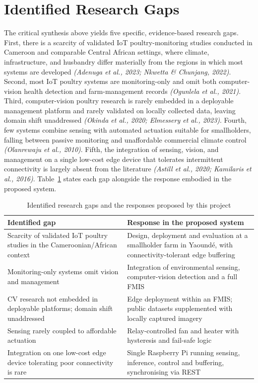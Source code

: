 \documentclass[12pt,a4paper]{report}
\begin{document}
\section{Identified Research Gaps}

The critical synthesis above yields five specific, evidence-based research gaps. First, there is a scarcity of validated IoT poultry-monitoring studies conducted in Cameroon and comparable Central African settings, where climate, infrastructure, and husbandry differ materially from the regions in which most systems are developed \textit{(Adenuga et al., 2023; Nkwetta \& Chunjang, 2022)}. Second, most IoT poultry systems are monitoring-only and omit both computer-vision health detection and farm-management records \textit{(Ogunlela et al., 2021)}. Third, computer-vision poultry research is rarely embedded in a deployable management platform and rarely validated on locally collected data, leaving domain shift unaddressed \textit{(Okinda et al., 2020; Elmessery et al., 2023)}. Fourth, few systems combine sensing with automated actuation suitable for smallholders, falling between passive monitoring and unaffordable commercial climate control \textit{(Olanrewaju et al., 2010)}. Fifth, the integration of sensing, vision, and management on a single low-cost edge device that tolerates intermittent connectivity is largely absent from the literature \textit{(Astill et al., 2020; Kamilaris et al., 2016)}. Table~\ref{tab:gaps} states each gap alongside the response embodied in the proposed system.

\begin{table}[tbp]
\caption{Identified research gaps and the responses proposed by this project}
\label{tab:gaps}
\centering
\small
\begin{tabularx}{\textwidth}{|X|X|}
\hline
\rowcolor{headerblue}
\textbf{Identified gap} & \textbf{Response in the proposed system} \\
\hline
Scarcity of validated IoT poultry studies in the Cameroonian/African context & Design, deployment and evaluation at a smallholder farm in Yaound\'e, with connectivity-tolerant edge buffering \\
\hline
Monitoring-only systems omit vision and management & Integration of environmental sensing, computer-vision detection and a full FMIS \\
\hline
CV research not embedded in deployable platforms; domain shift unaddressed & Edge deployment within an FMIS; public datasets supplemented with locally captured imagery \\
\hline
Sensing rarely coupled to affordable actuation & Relay-controlled fan and heater with hysteresis and fail-safe logic \\
\hline
Integration on one low-cost edge device tolerating poor connectivity is rare & Single Raspberry Pi running sensing, inference, control and buffering, synchronising via REST \\
\hline
\end{tabularx}
\end{table}
\end{document}
